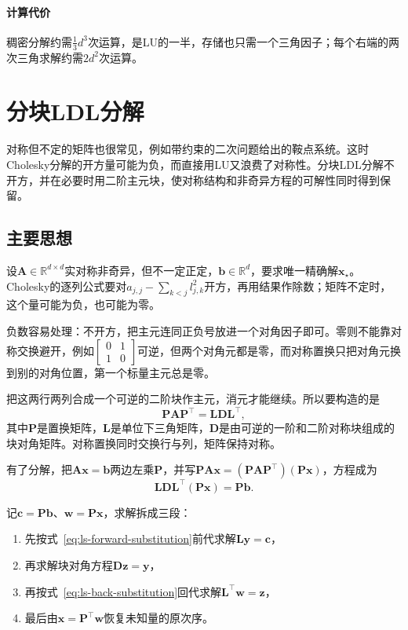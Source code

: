 \paragraph{计算代价}
稠密分解约需$\tfrac13d^3$次运算，是LU的一半，存储也只需一个三角因子；每个右端的两次三角求解约需$2d^2$次运算。

\section{分块LDL分解}
\label{sec:ls-ldlt}

对称但不定的矩阵也很常见，例如带约束的二次问题给出的鞍点系统。这时Cholesky分解的开方量可能为负，而直接用LU又浪费了对称性。分块LDL分解不开方，并在必要时用二阶主元块，使对称结构和非奇异方程的可解性同时得到保留。

\subsection{主要思想}
设$\bm A\in\mathbb R^{d\times d}$实对称非奇异，但不一定正定，$\bm b\in\mathbb R^d$，要求唯一精确解$\bm x_\star$。Cholesky的逐列公式要对$a_{j,j}-\sum_{k<j}l_{j,k}^2$开方，再用结果作除数；矩阵不定时，这个量可能为负，也可能为零。

负数容易处理：不开方，把主元连同正负号放进一个对角因子即可。零则不能靠对称交换避开，例如$\left[\begin{smallmatrix}0&1\\1&0\end{smallmatrix}\right]$可逆，但两个对角元都是零，而对称置换只把对角元换到别的对角位置，第一个标量主元总是零。

把这两行两列合成一个可逆的二阶块作主元，消元才能继续。所以要构造的是
\begin{equation}
 \bm P\bm A\bm P^\top=\bm L\bm D\bm L^\top,
 \label{eq:ls-ldlt}
\end{equation}
其中$\bm P$是置换矩阵，$\bm L$是单位下三角矩阵，$\bm D$是由可逆的一阶和二阶对称块组成的块对角矩阵。对称置换同时交换行与列，矩阵保持对称。

有了分解，把$\bm A\bm x=\bm b$两边左乘$\bm P$，并写$\bm P\bm A\bm x=(\bm P\bm A\bm P^\top)(\bm P\bm x)$，方程成为
\[
  \bm L\bm D\bm L^\top(\bm P\bm x)=\bm P\bm b .
\]

记$\bm c=\bm P\bm b$、$\bm w=\bm P\bm x$，求解拆成三段：
\begin{enumerate}
\item 先按式~\eqref{eq:ls-forward-substitution}前代求解$\bm L\bm y=\bm c$，
\item 再求解块对角方程$\bm D\bm z=\bm y$，
\item 再按式~\eqref{eq:ls-back-substitution}回代求解$\bm L^\top\bm w=\bm z$，
\item 最后由$\bm x=\bm P^\top\bm w$恢复未知量的原次序。
\end{enumerate}

